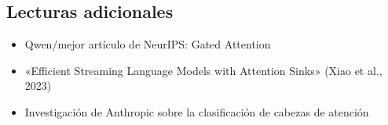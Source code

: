 \documentclass[a4paper]{article}
\begin{document}
\subsection{Lecturas adicionales}
\begin{itemize}
  \item Qwen/mejor artículo de NeurIPS: Gated Attention
  \item «Efficient Streaming Language Models with Attention Sinks» (Xiao et al., 2023)
  \item Investigación de Anthropic sobre la clasificación de cabezas de atención
\end{itemize}
\end{document}
